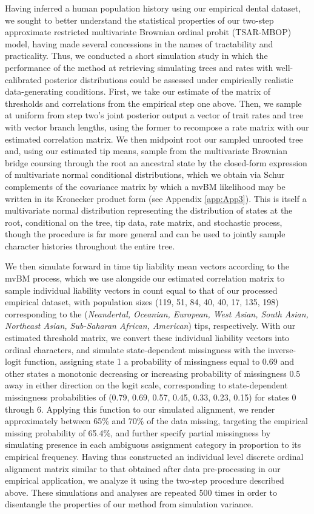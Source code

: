 Having inferred a human population history using our empirical dental dataset, we sought to better understand the statistical properties of our two-step approximate restricted multivariate Brownian ordinal probit (TSAR-MBOP) model, having made several concessions in the names of tractability and practicality. Thus, we conducted a short simulation study in which the performance of the method at retrieving simulating trees and rates with well-calibrated posterior distributions could be assessed under empirically realistic data-generating conditions. First, we take our estimate of the matrix of thresholds and correlations from the empirical step one above. Then, we sample at uniform from step two's joint posterior output a vector of trait rates and tree with vector branch lengths, using the former to recompose a rate matrix with our estimated correlation matrix. We then midpoint root our sampled unrooted tree and, using our estimated tip means, sample from the multivariate Brownian bridge coursing through the root an ancestral state by the closed-form expression of multivariate normal conditional distributions, which we obtain via Schur complements of the covariance matrix by which a mvBM likelihood may be written in its Kronecker product form (see Appendix \ref{app:App3}). This is itself a multivariate normal distribution representing the distribution of states at the root, conditional on the tree, tip data, rate matrix, and stochastic process, though the procedure is far more general and can be used to jointly sample character histories throughout the entire tree. 

We then simulate forward in time tip liability mean vectors according to the mvBM process, which we use alongside our estimated correlation matrix to sample individual liability vectors in count equal to that of our processed empirical dataset, with population sizes (119, 51, 84, 40, 40, 17, 135, 198) corresponding to the (\textit{Neandertal, Oceanian, European, West Asian, South Asian, Northeast Asian, Sub-Saharan African, American}) tips, respectively. With our estimated threshold matrix, we convert these individual liability vectors into ordinal characters, and simulate state-dependent missingness with the inverse-logit function, assigning state 1 a probability of missingness equal to 0.69 and other states a monotonic decreasing or increasing probability of missingness 0.5 away in either direction on the logit scale, corresponding to state-dependent missingness probabilities of (0.79, 0.69, 0.57, 0.45, 0.33, 0.23, 0.15) for states 0 through 6. Applying this function to our simulated alignment, we render approximately between 65\% and 70\% of the data missing, targeting the empirical missing probability of 65.4\%, and further specify partial missingness by simulating presence in each ambiguous assignment category in proportion to its empirical frequency. Having thus constructed an individual level discrete ordinal alignment matrix similar to that obtained after data pre-processing in our empirical application, we analyze it using the two-step procedure described above. These simulations and analyses are repeated 500 times in order to disentangle the properties of our method from simulation variance.

